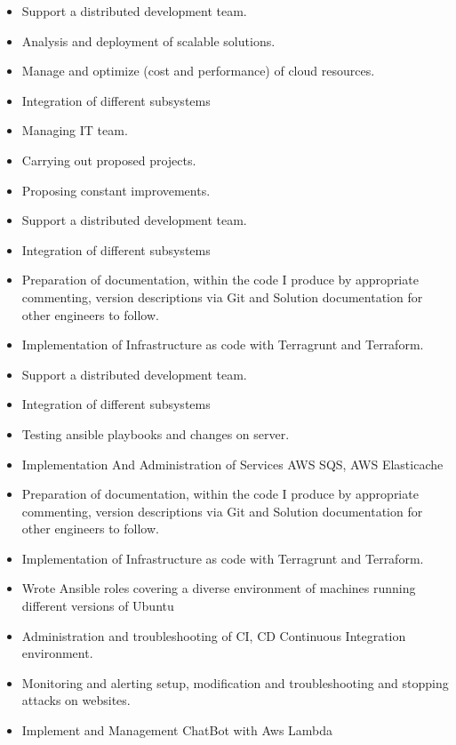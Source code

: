 \divider

\begin{itemize}
    \item Support a distributed development team.
    \item Analysis and deployment of scalable solutions.
    \item Manage and optimize (cost and performance) of cloud resources.
    \item Integration of different subsystems
    \item Managing IT team.
    \item Carrying out proposed projects.
    \item Proposing constant improvements.
    \item Support a distributed development team.
    \item Integration of different subsystems
\end{itemize}

\divider

\begin{itemize}
    \item Preparation of documentation, within the code I produce by appropriate commenting, version descriptions via Git and Solution documentation for other engineers to follow.
    \item Implementation of Infrastructure as code with Terragrunt and Terraform.
    \item Support a distributed development team.
    \item Integration of different subsystems
    \item Testing ansible playbooks and changes on server.
    \item Implementation And Administration of Services AWS SQS, AWS Elasticache
\end{itemize}

\divider

\begin{itemize}
    \item Preparation of documentation, within the code I produce by appropriate commenting, version descriptions via Git and Solution documentation for other engineers to follow.
    \item Implementation of Infrastructure as code with Terragrunt and Terraform.
    \item Wrote Ansible roles covering a diverse environment of machines running different versions of Ubuntu
    \item Administration and troubleshooting of CI, CD Continuous Integration environment.
    \item Monitoring and alerting setup, modification and troubleshooting and stopping attacks on websites.
    \item Implement and Management ChatBot with Aws Lambda
\end{itemize}

